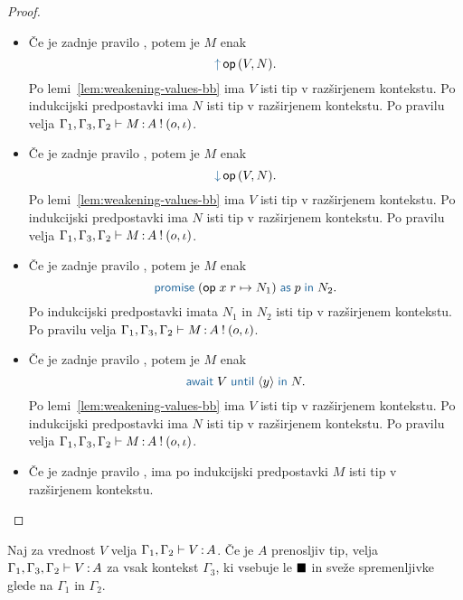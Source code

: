 \begin{proof}
\begin{itemize}
		\item Če je zadnje pravilo , potem je $M$ enak $$\tmopout{op}{V}{N}.$$
		Po lemi~\ref{lem:weakening-values-bb} ima $V$ isti tip v razširjenem kontekstu.
		Po indukcijski predpostavki ima $N$ isti tip v razširjenem kontekstu.
		Po pravilu  velja $\Gamma_1, \Gamma_3, \Gamma_2 \vdash M \mathinner{:} A \mathbin{!} (o, \iota)$.
		
		\item Če je zadnje pravilo , potem je $M$ enak $$\tmopin{op}{V}{N}.$$
		Po lemi~\ref{lem:weakening-values-bb} ima $V$ isti tip v razširjenem kontekstu.
		Po indukcijski predpostavki ima $N$ isti tip v razširjenem kontekstu.
		Po pravilu  velja $\Gamma_1, \Gamma_3, \Gamma_2 \vdash M \mathinner{:} A \mathbin{!} (o, \iota)$.
		
		\item Če je zadnje pravilo , potem je $M$ enak $$\tmwithrec{op}{x}{r}{N_1}{p}{N_2}.$$
		Po indukcijski predpostavki imata $N_1$ in $N_2$ isti tip v razširjenem kontekstu.
		Po pravilu  velja $\Gamma_1, \Gamma_3, \Gamma_2 \vdash M \mathinner{:} A \mathbin{!} (o, \iota)$.
		
		\item Če je zadnje pravilo , potem je $M$ enak $$\tmawait{V}{y}{N}.$$
		Po lemi~\ref{lem:weakening-values-bb} ima $V$ isti tip v razširjenem kontekstu.
		Po indukcijski predpostavki ima $N$ isti tip v razširjenem kontekstu.
		Po pravilu  velja $\Gamma_1, \Gamma_3, \Gamma_2 \vdash M \mathinner{:} A \mathbin{!} (o, \iota)$.
		
		\item Če je zadnje pravilo , ima po indukcijski predpostavki $M$ isti tip v razširjenem kontekstu.
		
	\end{itemize}
\end{proof}


\begin{lema}\label{lem:weakening-values-prenosljiv}
	Naj za vrednost $V$ velja $\Gamma_1, \Gamma_2 \vdash V \mathinner{:} A$. Če je $A$ prenosljiv tip, velja $\Gamma_1, \Gamma_3, \Gamma_2 \vdash V \mathinner{:} A$ za vsak kontekst $\Gamma_3$, ki vsebuje le $\blacksquare$ in sveže spremenljivke glede na $\Gamma_1$ in $\Gamma_2$.
\end{lema}

